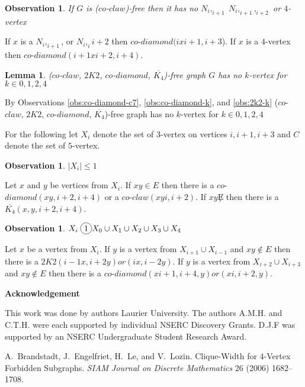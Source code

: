 \documentclass[12pt]{article}
\newcommand*\circled[1]{\tikz[baseline=(char.base)]{
            \node[shape=circle,draw,inner sep=2pt] (char) {#1};}}
\newtheorem{Lemma}[Theorem]{Lemma}
\newtheorem{Observation}[Theorem]{Observation}
\def\FAMILY{($co$-$claw$, $2K2$, $co$-$diamond$, $\overline{K_4}$)}
\begin{document}
\begin{Observation}\label{obs:co-claw-k}
If $G$ is ($co$-$claw$)-free then it has no $N_i,_{i+1}\; N_i,_{i+1},_{i+2}$ or $4$-vertex
\end{Observation}
 If $x$ is a $N_i,_{i+1}$, or $N_i,_i{i+2}$ then $co$-$diamond (ixi+1, i+3$). If $x$ is a $4$-vertex then $co$-$diamond (i+1xi+2, i+4)$.

\begin{Lemma}\label{lem:k-c5}
{\FAMILY}-free graph $G$ has no $k$-vertex for $k \in {0, 1, 2, 4}$
\end{Lemma}
 By Observations \ref{obs:co-diamond-c7}, \ref{obs:co-diamond-k}, and \ref{obs:2k2-k} {\FAMILY}-free graph has no $k$-vertex for $k \in {0, 1, 2, 4}$

For the following let $X_i$ denote the set of $3$-vertex on vertices $i,i+1,i+3$ and $C$ denote the set of $5$-vertex.

\begin{Observation}\label{obs:one-xi}
$|X_i| \leq 1$
\end{Observation}
 Let $x$ and $y$ be vertices from $X_i$. If $xy \in E$ then there is a $co$-$diamond (xy, i+2, i+4)$ or a $co$-$claw(xyi, i+2)$. If $xy \not E$ then there is a $\overline{K_4}(x, y, i+2, i+4)$.

\begin{Observation}\label{obs:xi-clique}
$X_i\; \circled{1} X_0 \cup X_1 \cup X_2 \cup X_3 \cup X_4$ 
\end{Observation}
 Let $x$ be a vertex from $X_i$. If $y$ is a vertex from $X_{i+1} \cup X_{i-1}$ and $xy \not \in E$ then there is a $2K2 (i-1x, i+2y) or (ix, i-2y)$. If $y$ is a vertex from $X_{i+2} \cup X_{i+3}$ and $xy \not \in E$ then there is a $co$-$diamond (xi+1, i+4, y) or (xi, i+2, y)$.

\begin{center}
{\bf Acknowledgement}
\end{center}
This work was done by authors  Laurier University. The authors A.M.H. and C.T.H. were each supported by individual NSERC Discovery Grants. D.J.F was supported by an NSERC Undergraduate Student Research Award.


\clearpage
\begin{thebibliography}{99}


    A.~Brandstadt, J.~Engelfriet, H.~Le, and V.~Lozin. Clique-Width for $4$-Vertex Forbidden Subgraphs.  {\sl SIAM
     Journal on Discrete Mathematics} 26 (2006) 1682--1708.

\end{thebibliography}
\end{document}
